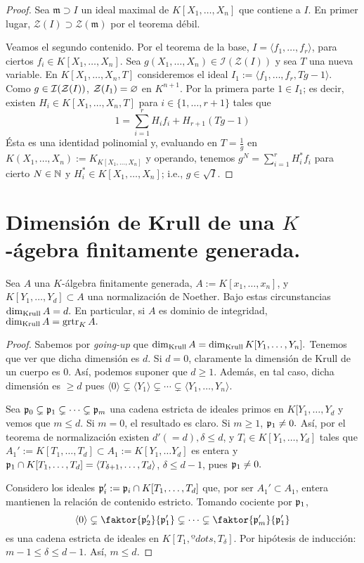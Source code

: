 \documentclass[../main.tex]{subfiles}
\begin{document}
\begin{proof}
	Sea $\mathfrak{m}\supset I$ un ideal maximal de $K[X_1,\dots,X_n]$ que contiene a $I.$ En primer lugar, $\mathcal{Z}(I)\supset\mathcal{Z}(\mathfrak{m})$ por el teorema débil.
	
	Veamos el segundo contenido. Por el teorema de la base, $I=\langle f_1,\dots,f_r\rangle$, para ciertos $f_i\in K[X_1,\dots,X_n].$ Sea $g(X_1,\dots,X_n)\in\mathcal{I}(\mathcal{Z}(I))$ y sea $T$ una nueva variable. En $K[X_1,\dots,X_n,T]$ consideremos el ideal $I_1:=\langle f_1,\dots,f_r,Tg-1\rangle.$ Como $g\in\mathcal{I}(\mathcal{Z}(I))$, $\mathcal{Z}(I_1)=\varnothing$ en $K^{n+1}.$ Por la primera parte $1\in I_1$; es decir, existen $H_i\in K[X_1,\dots,X_n,T]$ para $i\in\{1,\dots,r+1\}$ tales que
	$$1=\sum_{i=1}^rH_i f_i+H_{r+1}(Tg-1)$$
	Ésta es una identidad polinomial y, evaluando en $T=\frac{1}{g}$ en $K(X_1,\dots,X_n):=K_{K[X_1,\dots,X_n]}$ y operando, tenemos $g^N=\sum_{i=1}^rH_i^*f_i$ para cierto $N\in \mathbb{N}$ y $H_i^*\in K[X_1,\dots,X_n]$; i.e., $g\in\sqrt I.$
\end{proof}

\section{Dimensión de Krull de una $K$-ágebra finitamente generada.}
\begin{theorem}
	Sea $A$ una $K$-álgebra finitamente generada, $A:=K[x_1,\dots,x_n]$, y $K[Y_1,\dots,Y_d]\subset A$ una normalización de Noether. Bajo estas circunstancias $\dim_{\text{Krull}} A=d.$ En particular, si $A$ es dominio de integridad, $\dim_{\text{Krull}} A=\operatorname{grtr}_K A.$
\end{theorem}

\begin{proof}
	Sabemos por \textit{going-up} que $\dim_{\text{Krull}} A=\dim_{\text{Krull}} {K[Y_1,\dots,Y_n]}.$ Tenemos que ver que dicha dimensión es $d.$ Si $d=0$, claramente la dimensión de Krull de un cuerpo es $0.$ Así, podemos suponer que $d\ge 1.$ Además, en tal caso, dicha dimensión es $\ge d$ pues $\langle 0\rangle\subsetneq\langle Y_1\rangle\subsetneq\cdots\subsetneq\langle Y_1,\dots, Y_n\rangle.$
	
	Sea $\mathfrak{p}_0\subsetneq\mathfrak{p}_1\subsetneq\cdots\subsetneq\mathfrak{p}_m$ una cadena estricta de ideales primos en $K[Y_1,\dots,Y_d$ y vemos que $m\le d.$ Si $m=0$, el resultado es claro. Si $m\ge 1$, $\mathfrak{p}_1\neq 0.$ Así, por el teorema de normalización existen $d'(=d), \delta\le d$, y $T_i\in K[Y_1,\dots,Y_d]$ tales que $A_1':=K[T_1,\dots,T_d]\subset A_1:=K[Y_1,\dots Y_d]$ es entera y $\mathfrak{p}_1\cap K[T_1,\dots, T_d]=\langle T_{\delta+1},\dots,T_d\rangle$, $\delta\le d-1$, pues $\mathfrak{p}_1\neq 0.$ 
	
	Considero los ideales $\mathfrak{p}_i':=\mathfrak{p}_i\cap K[T_1,\dots,T_d]$ que, por ser $A_1'\subset A_1$, entera mantienen la relación de contenido estricto. Tomando cociente por $\mathfrak{p}_1$,
	$$\langle 0\rangle\subsetneq \faktor{\p_2'}{\p_1'}\subsetneq\cdots\subsetneq\faktor{\p_m'}{\p_1'}$$
	es una cadena estricta de ideales en $K[T_1,ºdots, T_\delta].$ Por hipótesis de inducción: $m-1\le\delta\le d-1.$ Así, $m\le d.$
\end{proof}
\end{document}
